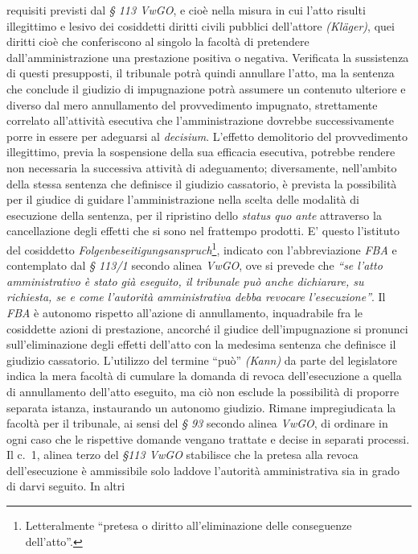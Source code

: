 \documentclass[12pt,it,a4paper,]{report}
\begin{document}
requisiti previsti dal \emph{§ 113 VwGO}, e cioè nella misura in cui
l'atto risulti illegittimo e lesivo dei cosiddetti diritti civili
pubblici dell'attore \emph{(Kläger)}, quei diritti cioè che conferiscono
al singolo la facoltà di pretendere dall'amministrazione una prestazione
positiva o negativa. Verificata la sussistenza di questi presupposti, il
tribunale potrà quindi annullare l'atto, ma la sentenza che conclude il
giudizio di impugnazione potrà assumere un contenuto ulteriore e diverso
dal mero annullamento del provvedimento impugnato, strettamente
correlato all'attività esecutiva che l'amministrazione dovrebbe
successivamente porre in essere per adeguarsi al \emph{decisium}.
L'effetto demolitorio del provvedimento illegittimo, previa la
sospensione della sua efficacia esecutiva, potrebbe rendere non
necessaria la successiva attività di adeguamento; diversamente,
nell'ambito della stessa sentenza che definisce il giudizio cassatorio,
è prevista la possibilità per il giudice di guidare l'amministrazione
nella scelta delle modalità di esecuzione della sentenza, per il
ripristino dello \emph{status quo ante} attraverso la cancellazione
degli effetti che si sono nel frattempo prodotti. E' questo l'istituto
del cosiddetto \emph{Folgenbeseitigungsanspruch}\footnote{Letteralmente
  ``pretesa o diritto all'eliminazione delle conseguenze dell'atto''.},
indicato con l'abbreviazione \emph{FBA} e contemplato dal \emph{§ 113/1}
secondo alinea \emph{VwGO}, ove si prevede che \emph{``se l'atto
amministrativo è stato già eseguito, il tribunale può anche dichiarare,
su richiesta, se e come l'autorità amministrativa debba revocare
l'esecuzione''}. Il \emph{FBA} è autonomo rispetto all'azione di
annullamento, inquadrabile fra le cosiddette azioni di prestazione,
ancorché il giudice dell'impugnazione si pronunci sull'eliminazione
degli effetti dell'atto con la medesima sentenza che definisce il
giudizio cassatorio. L'utilizzo del termine ``può'' \emph{(Kann)} da
parte del legislatore indica la mera facoltà di cumulare la domanda di
revoca dell'esecuzione a quella di annullamento dell'atto eseguito, ma
ciò non esclude la possibilità di proporre separata istanza, instaurando
un autonomo giudizio. Rimane impregiudicata la facoltà per il tribunale,
ai sensi del \emph{§ 93} secondo alinea \emph{VwGO}, di ordinare in ogni
caso che le rispettive domande vengano trattate e decise in separati
processi. Il c.~1, alinea terzo del \emph{§113 VwGO} stabilisce che la
pretesa alla revoca dell'esecuzione è ammissibile solo laddove
l'autorità amministrativa sia in grado di darvi seguito. In altri
\end{document}

